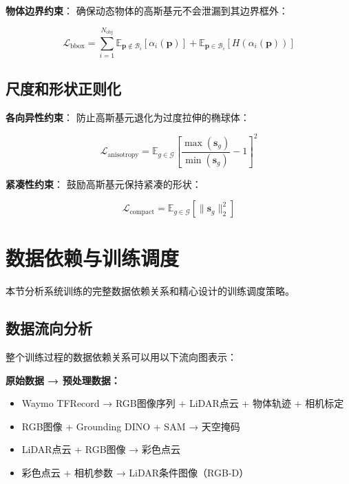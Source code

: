 \textbf{物体边界约束}：
确保动态物体的高斯基元不会泄漏到其边界框外：

\begin{equation}
\mathcal{L}_{\text{bbox}} = \sum_{i=1}^{N_{\text{obj}}} \mathbb{E}_{\mathbf{p} \notin \mathcal{B}_i} [\alpha_i(\mathbf{p})] + \mathbb{E}_{\mathbf{p} \in \mathcal{B}_i} [H(\alpha_i(\mathbf{p}))]
\label{eq:bbox_constraint}
\end{equation}

\subsection{尺度和形状正则化}

\textbf{各向异性约束}：
防止高斯基元退化为过度拉伸的椭球体：

\begin{equation}
\mathcal{L}_{\text{anisotropy}} = \mathbb{E}_{g \in \mathcal{G}} \left[ \frac{\max(\mathbf{s}_g)}{\min(\mathbf{s}_g)} - 1 \right]^2
\label{eq:anisotropy_regularization}
\end{equation}

\textbf{紧凑性约束}：
鼓励高斯基元保持紧凑的形状：

\begin{equation}
\mathcal{L}_{\text{compact}} = \mathbb{E}_{g \in \mathcal{G}} \left[ \|\mathbf{s}_g\|_2^2 \right]
\label{eq:compactness_regularization}
\end{equation}

\section{数据依赖与训练调度}

本节分析系统训练的完整数据依赖关系和精心设计的训练调度策略。

\subsection{数据流向分析}

整个训练过程的数据依赖关系可以用以下流向图表示：

\textbf{原始数据 → 预处理数据：}
\begin{itemize}
\item Waymo TFRecord → RGB图像序列 + LiDAR点云 + 物体轨迹 + 相机标定
\item RGB图像 + Grounding DINO + SAM → 天空掩码
\item LiDAR点云 + RGB图像 → 彩色点云
\item 彩色点云 + 相机参数 → LiDAR条件图像（RGB-D）
\end{itemize}

